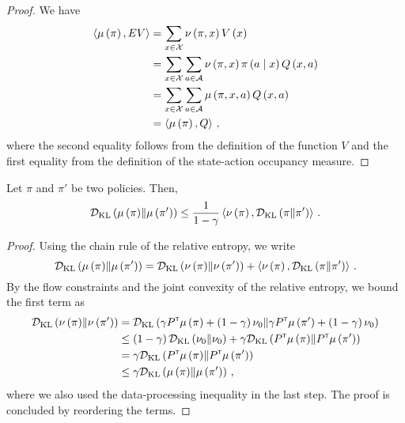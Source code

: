 \begin{proof}
  We have
  \begin{align*}
    \left\langle \mu \left( \pi \right), E V \right\rangle &= \sum_{x \in \mathcal{X}} \nu \left( \pi, x \right) V \left( x \right) \\
    &= \sum_{x \in \mathcal{X}} \sum_{a \in \mathcal{A}} \nu \left( \pi, x \right) \pi \left( a \mathrel{}\middle|\mathrel{} x \right) Q \left( x, a \right) \\
    &= \sum_{x \in \mathcal{X}} \sum_{a \in \mathcal{A}} \mu \left( \pi, x, a \right) Q \left( x, a \right) \\
    &= \left\langle \mu \left( \pi \right), Q \right\rangle\,,
  \end{align*}
  where the second equality follows from the definition of the function $V$ and the first equality from the definition of the state-action occupancy measure.
\end{proof}

\begin{lemma}\label{lem:ineq-kl-entropy}
    Let $\pi$ and $\pi'$ be two policies. Then,
    \begin{equation*}
      \mathcal{D}_{\text{KL}} \left( \mu \left( \pi \right) \middle\| \mu \left( \pi' \right) \right) \leq \frac{1}{1 - \gamma} \left\langle \nu \left( \pi \right), \mathcal{D}_{\text{KL}} \left( \pi \| \pi' \right) \right\rangle\,.
    \end{equation*}
  \end{lemma}
  
\begin{proof}
  Using the chain rule of the relative entropy, we write
  \begin{equation*}
      \mathcal{D}_{\text{KL}} \left( \mu \left( \pi \right) \middle\| \mu \left( \pi' \right) \right) = \mathcal{D}_{\text{KL}} \left( \nu \left( \pi \right) \middle\| \nu \left( \pi' \right) \right) + \left\langle \nu \left( \pi \right), \mathcal{D}_{\text{KL}} \left( \pi \middle\| \pi' \right) \right\rangle\,.
  \end{equation*}
  By the flow constraints and the joint convexity of the relative entropy, we bound the first term as
  \begin{align*}
    \mathcal{D}_{\text{KL}} \left( \nu \left( \pi \right) \middle\| \nu \left( \pi' \right) \right) &= \mathcal{D}_{\text{KL}} \left( \gamma P^\mathsf{\scriptscriptstyle T} \mu \left( \pi \right) + \left( 1 - \gamma \right) \nu_0 \middle\| \gamma P^\mathsf{\scriptscriptstyle T} \mu \left( \pi' \right) + \left( 1 - \gamma \right) \nu_0 \right) \\
    &\leq \left( 1 - \gamma \right) \mathcal{D}_{\text{KL}} \left( \nu_0 \middle\| \nu_0 \right) + \gamma \mathcal{D}_{\text{KL}} \left( P^\mathsf{\scriptscriptstyle T} \mu \left( \pi \right) \middle\| P^\mathsf{\scriptscriptstyle T} \mu \left( \pi' \right) \right) \\
    &= \gamma \mathcal{D}_{\text{KL}} \left( P^\mathsf{\scriptscriptstyle T} \mu \left( \pi \right) \middle\| P^\mathsf{\scriptscriptstyle T} \mu \left( \pi' \right) \right) \\
    &\leq \gamma \mathcal{D}_{\text{KL}} \left( \mu \left( \pi \right) \middle\| \mu \left( \pi' \right) \right)\,,
  \end{align*}
  where we also used the data-processing inequality in the last step. The proof is concluded by reordering the terms.
\end{proof}

